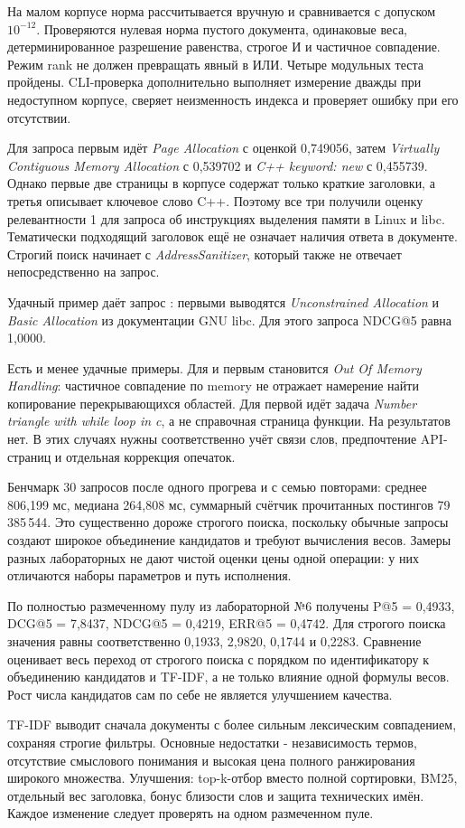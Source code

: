 \testing
На малом корпусе норма рассчитывается вручную и сравнивается
с допуском \(10^{-12}\). Проверяются нулевая норма пустого
документа, одинаковые веса, детерминированное разрешение равенства,
строгое И и частичное совпадение. Режим rank не должен превращать
явный \code{&&} в ИЛИ. Четыре модульных теста пройдены.
CLI-проверка дополнительно выполняет измерение дважды при недоступном
корпусе, сверяет неизменность индекса и проверяет ошибку при его отсутствии.

\results

Для запроса  первым идёт \emph{Page Allocation}
с оценкой 0,749056, затем \emph{Virtually Contiguous Memory Allocation}
с 0,539702 и \emph{C++ keyword: new} с 0,455739.
Однако первые две страницы в корпусе содержат только краткие
заголовки, а третья описывает ключевое слово C++. Поэтому все три
получили оценку релевантности 1 для запроса об инструкциях выделения
памяти в Linux и libc. Тематически подходящий заголовок ещё не означает
наличия ответа в документе. Строгий поиск начинает с
\emph{AddressSanitizer}, который также не отвечает непосредственно на запрос.

Удачный пример даёт запрос : первыми выводятся
\emph{Unconstrained Allocation} и \emph{Basic Allocation} из
документации GNU libc. Для этого запроса NDCG@5 равна 1,0000.

Есть и менее удачные примеры. Для  и
 первым становится \emph{Out Of Memory
Handling}: частичное совпадение по memory не отражает намерение
найти копирование перекрывающихся областей. Для 
первой идёт задача \emph{Number triangle with while loop in c},
а не справочная страница функции. На  результатов нет.
В этих случаях нужны соответственно учёт связи слов, предпочтение
API-страниц и отдельная коррекция опечаток.

Бенчмарк 30 запросов после одного прогрева и с семью повторами:
среднее 806,199 мс, медиана 264,808 мс, суммарный счётчик прочитанных
постингов 79\,385\,544. Это существенно дороже строгого
поиска, поскольку обычные запросы создают широкое объединение
кандидатов и требуют вычисления весов. Замеры разных лабораторных
не дают чистой оценки цены одной операции: у них отличаются
наборы параметров и путь исполнения.

По полностью размеченному пулу из лабораторной №6 получены
P@5 = 0,4933, DCG@5 = 7,8437, NDCG@5 = 0,4219,
ERR@5 = 0,4742. Для строгого поиска значения равны соответственно
0,1933, 2,9820, 0,1744 и 0,2283.
Сравнение оценивает весь переход от строгого поиска с порядком
по идентификатору к объединению кандидатов и TF-IDF, а не только
влияние одной формулы весов. Рост числа кандидатов сам по себе
не является улучшением качества.

\conclusions
TF-IDF выводит сначала документы с более сильным лексическим
совпадением, сохраняя строгие фильтры. Основные недостатки -
независимость термов, отсутствие смыслового понимания и высокая
цена полного ранжирования широкого множества. Улучшения:
top-k-отбор вместо полной сортировки, BM25, отдельный вес заголовка,
бонус близости слов и защита технических имён. Каждое изменение
следует проверять на одном размеченном пуле.
